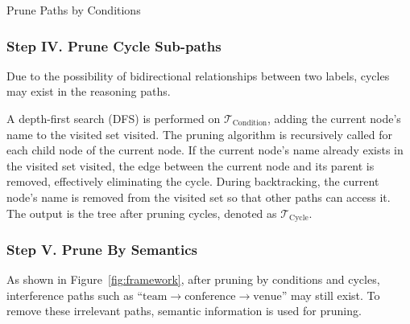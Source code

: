 \begin{algorithm}[htbp]
\caption{Prune Paths by Conditions}

\end{algorithm}

\subsubsection{Step IV. Prune Cycle Sub-paths}

Due to the possibility of bidirectional relationships between two labels, cycles may exist in the reasoning paths. 

A depth-first search (DFS) is performed on \( \mathcal{T}_{\text{Condition}} \), adding the current node's name to the visited set \( \text{visited} \). The pruning algorithm is recursively called for each child node of the current node. If the current node's name already exists in the visited set \( \text{visited} \), the edge between the current node and its parent is removed, effectively eliminating the cycle. During backtracking, the current node's name is removed from the visited set so that other paths can access it. The output is the tree after pruning cycles, denoted as \( \mathcal{T}_{\text{Cycle}} \).

\subsubsection{Step V. Prune By Semantics}

As shown in Figure~\ref{fig:framework}, after pruning by conditions and cycles, interference paths such as ``\( \text{team} \rightarrow \text{conference} \rightarrow \text{venue} \)'' may still exist. To remove these irrelevant paths, semantic information is used for pruning. 

